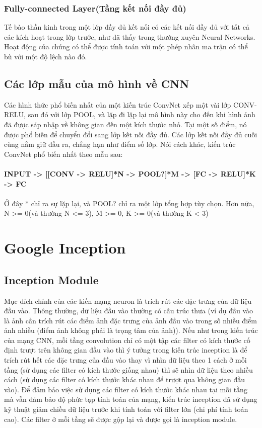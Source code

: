 \documentclass[a4paper,12pt]{report}
\begin{document}
\subsection{Fully-connected Layer(Tầng kết nối đầy đủ)}
Tế bào thần kinh trong một lớp đầy đủ kết nối có các kết nối đầy đủ với tất cả các kích hoạt trong lớp trước, như đã thấy trong thường xuyên Neural Networks. Hoạt động của chúng có thể được tính toán với một phép nhân ma trận có thể bù với một độ lệch nào đó.
\section{Các lớp mẫu của mô hình về CNN}
Các hình thức phổ biến nhất của một kiến trúc ConvNet xếp một vài lớp CONV-RELU, sau đó với lớp POOL, và lặp đi lặp lại mô hình này cho đến khi hình ảnh đã được sáp nhập về không gian đến một kích thước nhỏ. Tại một số điểm, nó được phổ biến để chuyển đổi sang lớp kết nối đầy đủ. Các lớp kết nối đầy đủ cuối cùng nắm giữ đầu ra, chẳng hạn như điểm số lớp. Nói cách khác, kiến trúc ConvNet phổ biến nhất theo mẫu sau: \\
\\
\small{
\textbf{INPUT -> [[CONV -> RELU]*N -> POOL?]*M -> [FC -> RELU]*K -> FC}
}
\\ \\
Ở đây * chỉ ra sự lặp lại, và POOL? chỉ ra một lớp tổng hợp tùy chọn. Hơn nữa, N >= 0(và thường N <= 3), M >= 0, K >= 0(và thường K < 3)


\chapter{Google Inception}
\section{Inception Module \cite{googlenet}}	
Mục đích chính của các kiến mạng neuron là trích rút các đặc trưng của dữ liệu đầu vào. Thông thường, dữ liệu đầu vào thường có cấu trúc thưa (ví dụ đầu vào là ảnh cần trích rút các điểm ảnh đặc trưng của ảnh đầu vào trong số nhiều điểm ảnh nhiễu (điểm ảnh không phải là trọng tâm của ảnh)). Nếu như trong kiến trúc của mạng CNN, mỗi tầng convolution chỉ có một tập các filter có kích thước cố định trượt trên không gian đầu vào thì ý tưởng trong kiến trúc inception là để trích rút hết các đặc trưng của đầu vào thay vì nhìn dữ liệu theo 1 cách ở mỗi tầng (sử dụng các filter có kích thước giống nhau) thì sẽ nhìn dữ liệu theo nhiều cách (sử dụng các filter có kích thước khác nhau để trượt qua không gian đầu vào). Để đảm bảo việc sử dụng các filter có kích thước khác nhau tại mỗi tầng mà vẫn đảm bảo độ phức tạp tính toán của mạng, kiến trúc inception đã sử dụng kỹ thuật giảm chiều dữ liệu trước khi tính toán với filter lớn (chi phí tính toán cao). Các filter ở mỗi tầng sẽ được gộp lại và được gọi là inception module.
\end{document}
